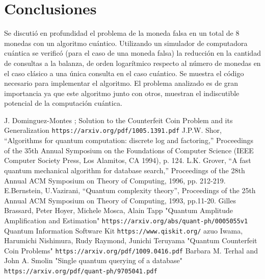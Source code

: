 \documentclass{article}
\begin{document}
\section*{Conclusiones}

 Se discutió en profundidad el problema de la moneda  falsa en un total de 8 monedas con un algoritmo cuántico. Utilizando un simulador de computadora cuántica se verificó (para el caso de una moneda falsa) la reducción en la cantidad de consultas a la balanza, de orden logarítmico respecto al número de monedas en el caso clásico a una única consulta en el caso cuántico. Se muestra el código necesario para implementar el algoritmo.
 El problema analizado es de gran importancia ya que este algoritmo junto con otros, muestran el  indiscutible potencial de la computación cuántica.

\begin{thebibliography}{}
J. Dominguez-Montes ; Solution to the Counterfeit Coin Problem and its Generalization
 \texttt{https://arxiv.org/pdf/1005.1391.pdf}
J.P.W. Shor, “Algorithms for quantum computation: discrete
log and factoring,” Proceedings of the 35th Annual
Symposium on the Foundations of Computer Science
(IEEE Computer Society Press, Los Alamitos, CA
1994), p. 124.
L.K. Grover, “A fast quantum mechanical algorithm for
database search,” Proceedings of the 28th Annual ACM
Symposium on Theory of Computing, 1996, pp. 212-219.
E.Bernstein, U.Vazirani, “Quantum complexity theory”,
Proceedings of the 25th Annual ACM Symposium on
Theory of Computing, 1993, pp.11-20.
Gilles Brassard, Peter Hoyer, Michele Mosca, Alain Tapp "Quantum Amplitude Amplification and Estimation"
    \texttt{https://arxiv.org/abs/quant-ph/0005055v1}
Quantum Information Software Kit
\texttt{https://www.qiskit.org/}
azuo Iwama, Harumichi Nishimura, Rudy Raymond, Junichi Teruyama "Quantum Counterfeit Coin Problems"
\texttt{https://arxiv.org/pdf/1009.0416.pdf}
Barbara M. Terhal and John A. Smolin "Single quantum querying of a database"
\texttt{https://arxiv.org/pdf/quant-ph/9705041.pdf}
\end{thebibliography}
\end{document}
